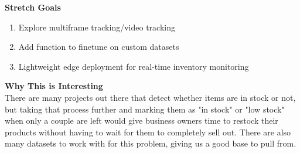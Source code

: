 \documentclass{article}
\begin{document}
\textbf{Stretch Goals} \\
\begin{enumerate}
    \item Explore multiframe tracking/video tracking
    \item Add function to finetune on custom datasets
    \item Lightweight edge deployment for real-time inventory monitoring
\end{enumerate}

\textbf{Why This is Interesting} \\
There are many projects out there that detect whether items are in stock or not, but taking that process further and marking them as "in stock" or "low stock" when only a couple are left would give business owners time to restock their products without having to wait for them to completely sell out. There are also many datasets to work with for this problem, giving us a good base to pull from.
\end{document}
